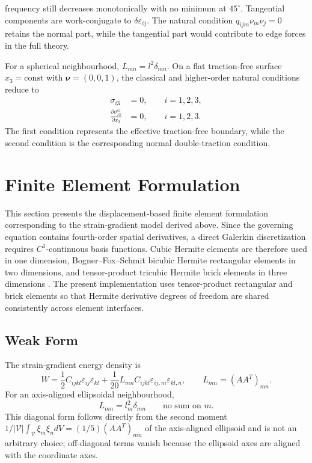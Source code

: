 \documentclass[final,3p,times,fleqn]{elsarticle}
\begin{document}
frequency still decreases monotonically with no minimum at $45^{\circ}$. Tangential components are work-conjugate to $\delta\varepsilon_{ij}$. The natural condition $q_{ijm}\nu_m\nu_j=0$ retains the normal part, while the tangential part would contribute to edge forces in the full theory.


For a spherical neighbourhood, $L_{mn}=l^2\delta_{mn}$. On a flat
traction-free surface $x_3=\mathrm{const}$ with
$\boldsymbol{\nu}=(0,0,1)$, the classical and higher-order natural
conditions reduce to
\begin{align}
\sigma_{i3}
&=
0,
\qquad i=1,2,3,
\label{eq:flat_free_traction}
\\
\frac{\partial\sigma_{i3}^{\mathrm{cl}}}{\partial x_3}
&=
0,
\qquad i=1,2,3.
\label{eq:flat_double_traction}
\end{align}
The first condition represents the effective traction-free boundary,
while the second condition is the corresponding normal double-traction
condition.


\section{Finite Element Formulation}
\label{sec:finite_element_formulation}

This section presents the displacement-based finite element formulation
corresponding to the strain-gradient model derived above. Since the
governing equation contains fourth-order spatial derivatives, a direct
Galerkin discretization requires $C^1$-continuous basis functions. Cubic
Hermite elements are therefore used in one dimension, Bogner--Fox--Schmit
bicubic Hermite rectangular elements in two dimensions, and
tensor-product tricubic Hermite brick elements in three dimensions
\cite{BognerFoxSchmit1966,PeteraPittman1994,Zervos2008,Papanicolopulos2009}.
The present implementation uses tensor-product rectangular and brick
elements so that Hermite derivative degrees of freedom are shared
consistently across element interfaces.

\subsection{Weak Form}
\label{subsec:weak_form_fem}

The strain-gradient energy density is
\begin{equation}
\label{eq:fem_energy_density_general}
W
=
\frac{1}{2}C_{ijkl}\varepsilon_{ij}\varepsilon_{kl}
+
\frac{1}{20}L_{mn}
C_{ijkl}\varepsilon_{ij,m}\varepsilon_{kl,n},
\qquad
L_{mn}=(AA^T)_{mn}.
\end{equation}
For an axis-aligned ellipsoidal neighbourhood,
\begin{equation}
\label{eq:fem_length_tensor}
L_{mn}
=
l_m^2\delta_{mn}
\qquad
\text{no sum on } m .
\end{equation}
This diagonal form follows directly from the second moment $1/|\mathcal{V}|\int_{\mathcal{V}}\xi_m\xi_n dV = (1/5)(AA^T)_{mn}$ of the axis-aligned ellipsoid and is not an arbitrary choice; off-diagonal terms vanish because the ellipsoid axes are aligned with the coordinate axes.
\end{document}
